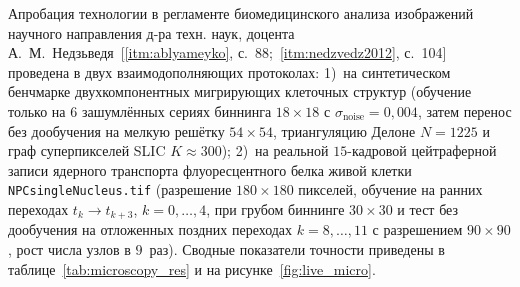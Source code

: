 Апробация технологии в регламенте биомедицинского анализа изображений научного направления д-ра техн. наук, доцента А.~М.~Недзьведя~[\ref{itm:ablyameyko}, с.~88;~\ref{itm:nedzvedz2012}, с.~104] проведена в двух взаимодополняющих протоколах: 1)~на синтетическом бенчмарке двухкомпонентных мигрирующих клеточных структур (обучение только на $6$ зашумлённых сериях биннинга $18\times 18$ с $\sigma_{\mathrm{noise}}=0{,}004$, затем перенос без дообучения на мелкую решётку $54\times 54$, триангуляцию Делоне $N=1225$ и граф суперпикселей SLIC $K\approx 300$); 2)~на реальной $15$-кадровой цейтраферной записи ядерного транспорта флуоресцентного белка живой клетки \texttt{NPCsingleNucleus.tif} (разрешение $180\times 180$ пикселей, обучение на ранних переходах $t_k\to t_{k+3}$, $k=0,\dots,4$, при грубом биннинге $30\times 30$ и тест без дообучения на отложенных поздних переходах $k=8,\dots,11$ с разрешением $90\times 90$, рост числа узлов в $9$~раз). Сводные показатели точности приведены в таблице~\ref{tab:microscopy_res} и на рисунке~\ref{fig:live_micro}.

